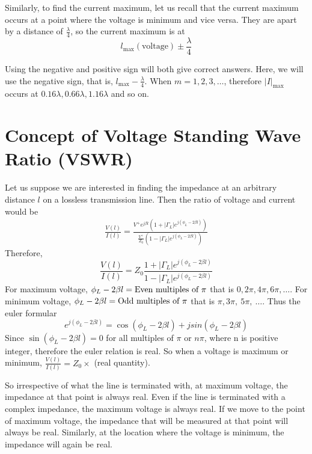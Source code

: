 \begin{exmp}
Similarly, to find the current maximum, let us recall that the current maximum occurs at a point where the voltage is minimum and vice versa. They are apart by a distance of $\frac{\lambda}{4}$, so the current maximum is at
\[
l_\max(\text{voltage})\pm \frac{\lambda}{4}
\]

Using the negative and positive sign will both give correct answers. Here, we will use the negative sign, that is, $l_\max-\frac{\lambda}{4}$. When $m = 1, 2, 3, \ldots$, therefore $|I|_\max$ occurs at $0.16\lambda , 0.66\lambda , 1.16\lambda$ and so on.
\end{exmp}

\section{Concept of Voltage Standing Wave Ratio (VSWR)}
Let us suppose we are interested in finding the impedance at an arbitrary distance $l$ on a lossless transmission line. Then the ratio of voltage and current would be
\begin{align*}
\frac{V(l)}{I(l)} = \frac{V^{+}e^{j\beta l}(1+ |\Gamma_L|e^{j(\phi_L- 2 \beta l)})}{\frac{V^{+}}{Z_0}(1- |\Gamma_L|e^{j(\phi_L- 2\beta l)})}
\end{align*}
Therefore,
\begin{equation*}
\frac{V(l)}{I(l)} = Z_0 \frac{1+ |\Gamma_L|e^{j(\phi_L- 2 \beta l)}}{1- |\Gamma_L|e^{j(\phi_L- 2\beta l)}}
\end{equation*}
For maximum voltage, $\phi_L-2\beta l = \textnormal{Even multiples of }\pi$ that is $0, 2\pi, 4\pi, 6\pi,\ldots$. For minimum voltage, $\phi_L-2\beta l=\textnormal{Odd multiples of } \pi$ that is $\pi, 3\pi,\ 5\pi,\ \ldots$. Thus the euler formular 
\[e^{j(\phi_L - 2 \beta l)} = \cos(\phi_L - 2 \beta l) + jsin(\phi_L - 2 \beta l)\]
Since $\sin(\phi_L - 2 \beta l) = 0$ for all multiples of $\pi$ or $n\pi$, where n is positive integer, therefore the euler relation is real. So when a voltage is maximum or minimum, $\frac{V(l)}{I(l)} = Z_0 \times$ (real quantity).

So irrespective of what the line is terminated with, at maximum voltage, the impedance at that point is always real. Even if the line is terminated with a complex impedance, the maximum voltage is always real. If we move to the point of maximum voltage, the impedance that will be measured at that point will always be real. Similarly, at the location where the voltage is minimum, the impedance will again be real.

